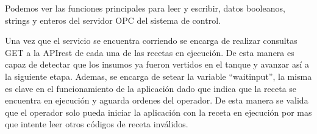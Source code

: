 Podemos ver las funciones principales para leer y escribir, datos booleanos, strings y enteros del servidor OPC del sistema de control.

Una vez que el servicio se encuentra corriendo se encarga de realizar consultas GET a la APIrest de cada una de las recetas en ejecución. De esta manera es capaz de detectar que los insumos ya fueron vertidos en el tanque y avanzar así a la siguiente etapa. Ademas, se encarga de setear la variable ``waitinput'', la misma es clave en el funcionamiento de la aplicación dado que indica que la receta se encuentra en ejecución y aguarda ordenes del operador. De esta manera se valida que el operador solo pueda iniciar la aplicación con la receta en ejecución por mas que intente leer otros códigos de receta inválidos. 



